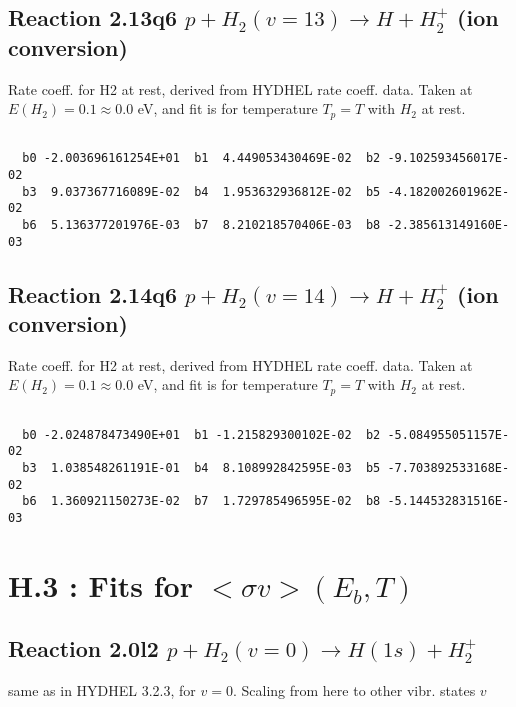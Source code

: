 \documentclass[12pt,dvipdfmx]{article}
\begin{document}
\subsection{
Reaction 2.13q6
$ p + H_2(v=13) \rightarrow H + H_2^+$ (ion conversion)
}
Rate coeff. for H2 at rest, derived from HYDHEL rate coeff. data.
Taken at $E(H_2) = 0.1 \approx 0.0$ eV,  and fit is for temperature $T_p=T$ with $H_2$ at rest.

\begin{small}\begin{verbatim}

  b0 -2.003696161254E+01  b1  4.449053430469E-02  b2 -9.102593456017E-02
  b3  9.037367716089E-02  b4  1.953632936812E-02  b5 -4.182002601962E-02
  b6  5.136377201976E-03  b7  8.210218570406E-03  b8 -2.385613149160E-03

\end{verbatim}\end{small}

\newpage
\subsection{
Reaction 2.14q6
$ p + H_2(v=14) \rightarrow H + H_2^+$ (ion conversion)
}
Rate coeff. for H2 at rest, derived from HYDHEL rate coeff. data.
Taken at $E(H_2) = 0.1 \approx 0.0$ eV,  and fit is for temperature $T_p=T$ with $H_2$ at rest.

\begin{small}\begin{verbatim}

  b0 -2.024878473490E+01  b1 -1.215829300102E-02  b2 -5.084955051157E-02
  b3  1.038548261191E-01  b4  8.108992842595E-03  b5 -7.703892533168E-02
  b6  1.360921150273E-02  b7  1.729785496595E-02  b8 -5.144532831516E-03

\end{verbatim}\end{small}

\newpage

\newpage
\section{H.3 :  Fits for $<\sigma v> (E_b,T)$}

\subsection{
Reaction 2.0l2 $   p + H_2(v=0) \rightarrow H(1s) + H_2^+$}
same as in HYDHEL 3.2.3, for $v=0$. Scaling from here to other vibr. states $v$
\end{document}
